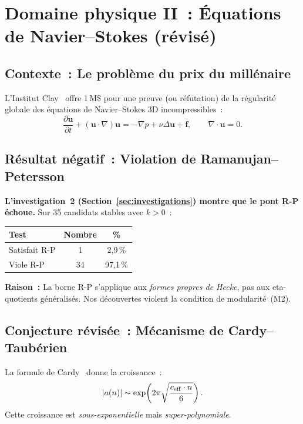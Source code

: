 \section{Domaine physique II~: Équations de Navier--Stokes (révisé)}
\label{sec:ns}

\subsection{Contexte~: Le problème du prix du millénaire}

L'Institut Clay~\cite{clay_navier_stokes} offre 1\,M\$ pour une preuve (ou réfutation) de la régularité globale des équations de Navier--Stokes 3D incompressibles~:
\begin{equation}
  \frac{\partial \mathbf{u}}{\partial t} + (\mathbf{u} \cdot \nabla)\mathbf{u} = -\nabla p + \nu \Delta \mathbf{u} + \mathbf{f}, \qquad \nabla \cdot \mathbf{u} = 0.
\end{equation}

\subsection{Résultat négatif~: Violation de Ramanujan--Petersson}

\textbf{L'investigation~2 (Section~\ref{sec:investigations}) montre que le pont R-P échoue.} Sur 35 candidats stables avec $k > 0$~:

\begin{center}
\begin{tabular}{lcc}
\toprule
\textbf{Test} & \textbf{Nombre} & \textbf{\%} \\
\midrule
Satisfait R-P & 1 & 2,9\,\% \\
Viole R-P & 34 & 97,1\,\% \\
\bottomrule
\end{tabular}
\end{center}

\textbf{Raison~:} La borne R-P s'applique aux \emph{formes propres de Hecke}, pas aux eta-quotients généralisés. Nos découvertes violent la condition de modularité~(M2).

\subsection{Conjecture révisée~: Mécanisme de Cardy--Taubérien}

La formule de Cardy~\cite{cardy_1986} donne la croissance~:
\[
  |a(n)| \sim \exp\!\left(2\pi \sqrt{\frac{c_{\mathrm{eff}} \cdot n}{6}}\right).
\]
Cette croissance est \emph{sous-exponentielle} mais \emph{super-polynomiale}.


